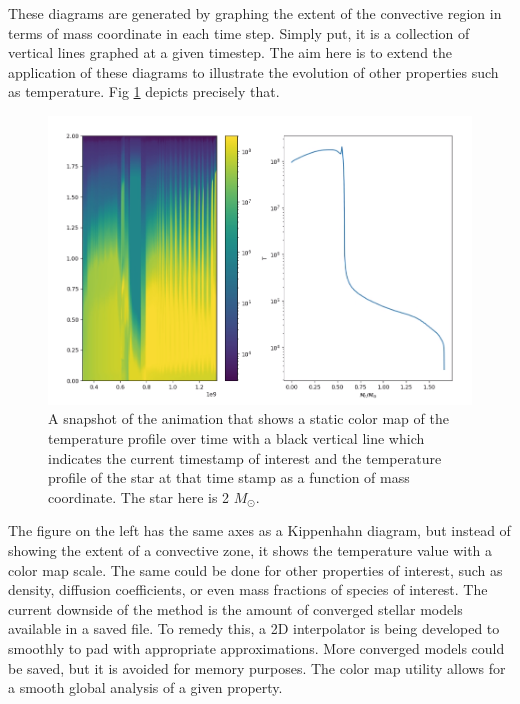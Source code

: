 \documentclass{article}
\begin{document}
These diagrams are generated by graphing the extent of the convective region in terms of mass coordinate in each time step. Simply 
put, it is a collection of vertical lines graphed at a given timestep. The aim here is to extend the application of these diagrams 
to illustrate the evolution of other properties such as temperature. Fig \ref{movie_cut} depicts precisely that.

\begin{figure}[H]
    \centerline{\includegraphics[scale = 0.5]{images/movie_slice.png}}
    \caption{A snapshot of the animation that shows a static color map of the temperature profile over time with a black vertical 
    line which indicates the current timestamp of interest and the temperature profile of the star at that time stamp as a function 
    of mass coordinate. The star here is 2 $M_{\odot}$.}
    \label{movie_cut}
\end{figure}

The figure on the left has the same axes as a Kippenhahn diagram, but instead of showing the extent of a convective zone, it shows 
the temperature value with a color map scale. The same could be done for other properties of interest, such as density, diffusion 
coefficients, or even mass fractions of species of interest. The current downside of the method is the amount of converged stellar 
models available in a saved file. To remedy this, a 2D interpolator is being developed to smoothly to pad with appropriate 
approximations. More converged models could be saved, but it is avoided for memory purposes. The color map utility allows for a 
smooth global analysis of a given property.  

\singlespacing



\end{document}

